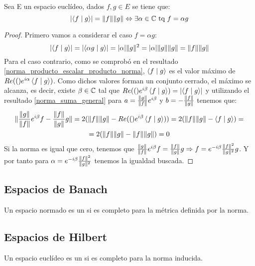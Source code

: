 \begin{resultado}
  Sea E un espacio euclídeo, dados $f,g\in E$ se tiene que:
  \begin{equation}
    \label{norma_producto_escalar_igual_producto_norma}
    \lvert\left\langle f\mid g\right\rangle\rvert=\lVert f\rVert\lVert g\rVert\Leftrightarrow \exists\alpha\in\mathbb{C}\text{ tq }f=\alpha g
  \end{equation}
\end{resultado}

\begin{proof}
  Primero vamos a considerar el caso $f=\alpha g$:
  \begin{equation*}
    \lvert\left\langle f\mid g\right\rangle\rvert=\lvert\left\langle\alpha g\mid g\right\rangle\rvert=\lvert\alpha\rvert\lVert g\rVert^2=\lvert\alpha\rvert\lVert g\rVert\lVert g\rVert=\lVert f\rVert\lVert g\rVert
  \end{equation*}
  Para el caso contrario, como se comprobó en el resultado \ref{norma_producto_escalar_producto_norma}, $\left\langle f\mid g\right\rangle$ es el valor máximo de $Re(()e^{i\alpha}\left\langle f\mid g\right\rangle)$. Como dichos valores forman un conjunto cerrado, el máximo se alcanza, es decir, existe $\beta\in\mathbb{C}$ tal que $Re(()e^{i\beta}\left\langle f\mid g\right\rangle)=\lvert\left\langle f\mid g\right\rangle\rvert$ y utilizando el resultado \ref{norma_suma_general} para $a=\frac{\lVert g\rVert}{\lVert f\rVert}e^{i\beta}$ y $b=-\frac{\lVert f\rVert}{\lVert g\rVert}$ tenemos que:
  \begin{multline*}
    \lVert\frac{\lVert g\rVert}{\lVert f\rVert}e^{i\beta}f-\frac{\lVert f\rVert}{\lVert g\rVert}g\rVert=2(\lVert f\rVert\lVert g\rVert-Re(()e^{i\beta}\left\langle f\mid g\right\rangle))=2(\lVert f\rVert\lVert g\rVert-\left\langle f\mid g\right\rangle)=\\
    =2(\lVert f\rVert\lVert g\rVert-\lVert f\rVert\lVert g\rVert)=0
  \end{multline*}
  Si la norma es igual que cero, tenemos que
  $\frac{\lVert g\rVert}{\lVert f\rVert}e^{i\beta}f=\frac{\lVert f\rVert}{\lVert g\rVert}g\Rightarrow f=e^{-i\beta}\frac{\lVert f\rVert^2}{\lVert g\rVert^2}g$. Y por tanto para $\alpha=e^{-i\beta}\frac{\lVert f\rVert^2}{\lVert g\rVert^2}$ tenemos la igualdad buscada.
\end{proof}

\subsection{Espacios de Banach}
\begin{definicion}
  \label{espacio_banach}
  Un espacio normado es un  si es completo para la métrica definida por la norma.
\end{definicion}

\subsection{Espacios de Hilbert}
\begin{definicion}
  \label{espacio_hilbert}
  Un espacio euclídeo es un  si es completo para la norma inducida.
\end{definicion}

